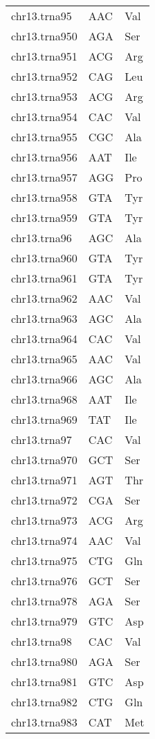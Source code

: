 \begin{longtable}{@{}l>{\collectcell\anticodon}l<{\endcollectcell}l@{}}
    chr13.trna95 & AAC & Val \\
    chr13.trna950 & AGA & Ser \\
    chr13.trna951 & ACG & Arg \\
    chr13.trna952 & CAG & Leu \\
    chr13.trna953 & ACG & Arg \\
    chr13.trna954 & CAC & Val \\
    chr13.trna955 & CGC & Ala \\
    chr13.trna956 & AAT & Ile \\
    chr13.trna957 & AGG & Pro \\
    chr13.trna958 & GTA & Tyr \\
    chr13.trna959 & GTA & Tyr \\
    chr13.trna96 & AGC & Ala \\
    chr13.trna960 & GTA & Tyr \\
    chr13.trna961 & GTA & Tyr \\
    chr13.trna962 & AAC & Val \\
    chr13.trna963 & AGC & Ala \\
    chr13.trna964 & CAC & Val \\
    chr13.trna965 & AAC & Val \\
    chr13.trna966 & AGC & Ala \\
    chr13.trna968 & AAT & Ile \\
    chr13.trna969 & TAT & Ile \\
    chr13.trna97 & CAC & Val \\
    chr13.trna970 & GCT & Ser \\
    chr13.trna971 & AGT & Thr \\
    chr13.trna972 & CGA & Ser \\
    chr13.trna973 & ACG & Arg \\
    chr13.trna974 & AAC & Val \\
    chr13.trna975 & CTG & Gln \\
    chr13.trna976 & GCT & Ser \\
    chr13.trna978 & AGA & Ser \\
    chr13.trna979 & GTC & Asp \\
    chr13.trna98 & CAC & Val \\
    chr13.trna980 & AGA & Ser \\
    chr13.trna981 & GTC & Asp \\
    chr13.trna982 & CTG & Gln \\
    chr13.trna983 & CAT & Met \\

\end{longtable}
